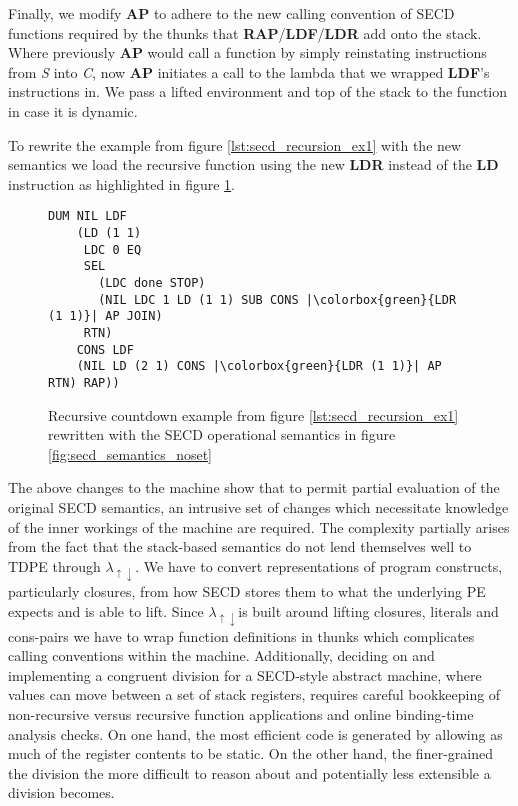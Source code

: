\documentclass[a4paper,12pt,twoside,openright]{report}
\theoremstyle{definition}
\newcommand{\mslang}{$\lambda_{\uparrow\downarrow}$}
\begin{document}
Finally, we modify \textbf{AP} to adhere to the new calling convention of SECD functions required by the thunks that \textbf{RAP}/\textbf{LDF}/\textbf{LDR} add onto the stack. Where previously \textbf{AP} would call a function by simply reinstating instructions from \textit{S} into \textit{C}, now \textbf{AP} initiates a call to the lambda that we wrapped \textbf{LDF}'s instructions in. We pass a lifted environment and top of the stack to the function in case it is dynamic.

To rewrite the example from figure \ref{lst:secd_recursion_ex1} with the new semantics we load the recursive function using the new \textbf{LDR} instead of the \textbf{LD} instruction as highlighted in figure \ref{lst:secd_recursion_ex1_newsem}.

\begin{figure}[ht]
\begin{verbatim}
DUM NIL LDF
    (LD (1 1)
     LDC 0 EQ
     SEL
       (LDC done STOP)
       (NIL LDC 1 LD (1 1) SUB CONS |\colorbox{green}{LDR (1 1)}| AP JOIN)
     RTN)
    CONS LDF
    (NIL LD (2 1) CONS |\colorbox{green}{LDR (1 1)}| AP RTN) RAP))
\end{verbatim}
\caption{Recursive countdown example from figure \ref{lst:secd_recursion_ex1} rewritten with the SECD operational semantics in figure \ref{fig:secd_semantics_noset}}
\label{lst:secd_recursion_ex1_newsem}
\end{figure}

The above changes to the machine show that to permit partial evaluation of the original SECD semantics, an intrusive set of changes which necessitate knowledge of the inner workings of the machine are required. The complexity partially arises from the fact that the stack-based semantics do not lend themselves well to TDPE through \mslang. We have to convert representations of program constructs, particularly closures, from how SECD stores them to what the underlying PE expects and is able to lift. Since \mslang is built around lifting closures, literals and cons-pairs we have to wrap function definitions in thunks which complicates calling conventions within the machine. Additionally, deciding on and implementing a congruent division for a SECD-style abstract machine, where values can move between a set of stack registers, requires careful bookkeeping of non-recursive versus recursive function applications and online binding-time analysis checks. On one hand, the most efficient code is generated by allowing as much of the register contents to be static. On the other hand, the finer-grained the division the more difficult to reason about and potentially less extensible a division becomes.
\end{document}
